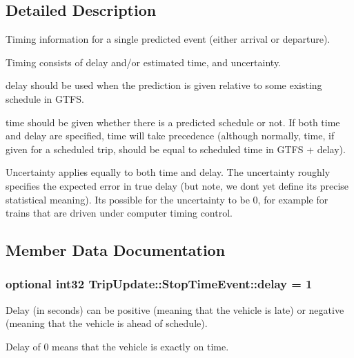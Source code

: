 \subsection{Detailed Description}
Timing information for a single predicted event (either arrival or departure). 

Timing consists of delay and/or estimated time, and uncertainty.
\begin{DoxyItemize}
\item delay should be used when the prediction is given relative to some existing schedule in G\+T\+FS.
\item time should be given whether there is a predicted schedule or not. If both time and delay are specified, time will take precedence (although normally, time, if given for a scheduled trip, should be equal to scheduled time in G\+T\+FS + delay).
\end{DoxyItemize}

Uncertainty applies equally to both time and delay. The uncertainty roughly specifies the expected error in true delay (but note, we don\textquotesingle{}t yet define its precise statistical meaning). It\textquotesingle{}s possible for the uncertainty to be 0, for example for trains that are driven under computer timing control. 

\subsection{Member Data Documentation}
\subsubsection[{\texorpdfstring{delay}{delay}}]{\setlength{\rightskip}{0pt plus 5cm}optional int32 Trip\+Update\+::\+Stop\+Time\+Event\+::delay = 1}\hypertarget{structTripUpdate_1_1StopTimeEvent_afe99bf7417c3476bab4bfef2de42031e}{}\label{structTripUpdate_1_1StopTimeEvent_afe99bf7417c3476bab4bfef2de42031e}


Delay (in seconds) can be positive (meaning that the vehicle is late) or negative (meaning that the vehicle is ahead of schedule). 

Delay of 0 means that the vehicle is exactly on time. 

